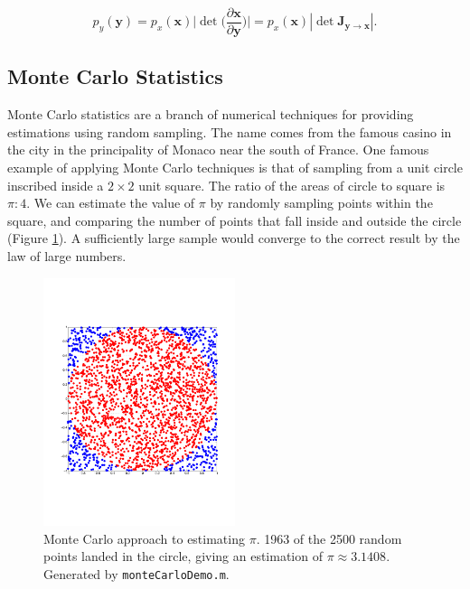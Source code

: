 \documentclass[11pt]{amsart}
\begin{document}
$$p_y(\mathbf{y}) = p_x(\mathbf{x})\big|\det \Bigg(\frac{\partial\mathbf{x}}{\partial\mathbf{y}}\Bigg)\big| = p_x(\mathbf{x})|\det \mathbf{J}_{\mathbf{y} \to \mathbf{x}}|.$$

\subsection{Monte Carlo Statistics}

Monte Carlo statistics are a branch of numerical techniques for providing estimations using random sampling. The name comes from the famous casino in the city in the principality of Monaco near the south of France. One famous example of applying Monte Carlo techniques is that of sampling from a unit circle inscribed inside a $2 \times 2$ unit square. The ratio of the areas of circle to square is $\pi : 4$. We can estimate the value of $\pi$ by randomly sampling points within the square, and comparing the number of points that fall inside and outside the circle (Figure \ref{fig:montecarlo}). A sufficiently large sample would converge to the correct result by the law of large numbers.

\begin{figure}[!ht]
\centering
\includegraphics[width=0.5\textwidth]{Figures/montecarlo.pdf}
\caption{Monte Carlo approach to estimating $\pi$. 1963 of the 2500 random points landed in the circle, giving an estimation of $\pi \approx 3.1408$. Generated by \texttt{monteCarloDemo.m}.}
\label{fig:montecarlo}
\end{figure}
\end{document}
